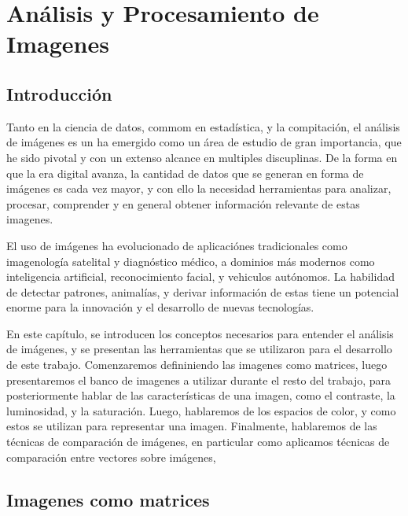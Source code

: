 \chapter{Análisis y Procesamiento de Imagenes }\label{chap5}

\section{Introducci\'on}

Tanto en la ciencia de datos, commom en estad\'istica, y la compitaci\'on, el an\'alisis de im\'agenes es un ha emergido como un \'area de estudio de gran importancia, que he sido pivotal y con un extenso alcance en multiples discuplinas. De la forma en que la era digital avanza, la cantidad de datos que se generan en forma de im\'agenes es cada vez mayor, y con ello la necesidad herramientas para analizar, procesar, comprender y en general obtener informaci\'on relevante de estas imagenes. 

El uso de im\'agenes ha evolucionado de aplicaci\'ones tradicionales como imagenolog\'ia satelital y diagn\'ostico m\'edico, a dominios m\'as modernos como inteligencia artificial, reconocimiento facial, y vehiculos aut\'onomos. La habilidad de detectar patrones, animal\'ias, y derivar informaci\'on de estas tiene un potencial enorme para la innovaci\'on y el desarrollo de nuevas tecnolog\'ias. 

En este cap\'itulo, se introducen los conceptos necesarios para entender el an\'alisis de im\'agenes, y se presentan las herramientas que se utilizaron para el desarrollo de este trabajo. Comenzaremos defininiendo las imagenes como matrices, luego presentaremos el banco de imagenes a utilizar durante el resto del trabajo, para posteriormente hablar de las caracter\'isticas de una imagen, como el contraste, la luminosidad, y la saturaci\'on. Luego, hablaremos de los espacios de color, y como estos se utilizan para representar una imagen. Finalmente, hablaremos de las t\'ecnicas de comparaci\'on de im\'agenes, en particular como aplicamos t\'ecnicas de comparaci\'on entre vectores sobre im\'agenes,

\section{Imagenes como matrices}

